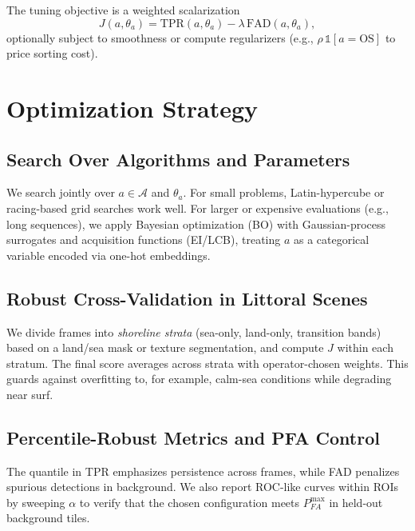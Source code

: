 \documentclass[10pt,letterpaper]{article}
\begin{document}
The tuning objective is a weighted scalarization
\begin{equation}
J(a,\theta_a)= \mathrm{TPR}(a,\theta_a) - \lambda\, \mathrm{FAD}(a,\theta_a), \label{eq:objective}
\end{equation}
optionally subject to smoothness or compute regularizers (e.g., \(\rho\,\mathbb{1}[a=\text{OS}]\) to price sorting cost).

\section{Optimization Strategy}
\subsection{Search Over Algorithms and Parameters}
We search jointly over \(a\in\mathcal{A}\) and \(\theta_a\). For small problems, Latin-hypercube or racing-based grid searches work well. For larger or expensive evaluations (e.g., long sequences), we apply Bayesian optimization (BO) with Gaussian-process surrogates and acquisition functions (EI/LCB), treating \(a\) as a categorical variable encoded via one-hot embeddings.

\subsection{Robust Cross-Validation in Littoral Scenes}
We divide frames into \emph{shoreline strata} (sea-only, land-only, transition bands) based on a land/sea mask or texture segmentation, and compute \(J\) within each stratum. The final score averages across strata with operator-chosen weights. This guards against overfitting to, for example, calm-sea conditions while degrading near surf.

\subsection{Percentile-Robust Metrics and PFA Control}
The quantile in TPR emphasizes persistence across frames, while FAD penalizes spurious detections in background. We also report ROC-like curves within ROIs by sweeping \(\alpha\) to verify that the chosen configuration meets \(P_{FA}^{\max}\) in held-out background tiles.
\end{document}
